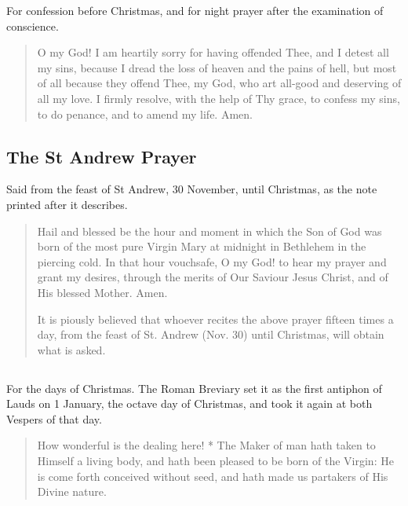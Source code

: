 For confession before Christmas, and for night prayer after the examination
of conscience.

\begin{quote}
O my God! I am heartily sorry for having offended Thee, and I detest all my sins, because I dread the loss of heaven and the pains of hell, but most of all because they offend Thee, my God, who art all-good and deserving of all my love. I firmly resolve, with the help of Thy grace, to confess my sins, to do penance, and to amend my life. Amen.\par
\end{quote}

\subsection{The St Andrew Prayer}

Said from the feast of St Andrew, 30 November, until Christmas, as the note
printed after it describes.

\begin{quote}
Hail and blessed be the hour and moment in which the Son of God was born of the most pure Virgin Mary at midnight in Bethlehem in the piercing cold. In that hour vouchsafe, O my God! to hear my prayer and grant my desires, through the merits of Our Saviour Jesus Christ, and of His blessed Mother. Amen.\par
It is piously believed that whoever recites the above prayer fifteen times a day, from the feast of St. Andrew (Nov. 30) until Christmas, will obtain what is asked.\par
\end{quote}

\subsection{}

For the days of Christmas. The Roman Breviary set it as the first
antiphon of Lauds on 1 January, the octave day of Christmas, and took it again
at both Vespers of that day.

\begin{quote}
\par
\end{quote}

\begin{quote}
How wonderful is the dealing here! * The Maker of man hath taken to Himself a living body, and hath been pleased to be born of the Virgin: He is come forth conceived without seed, and hath made us partakers of His Divine nature.\par
\end{quote}
